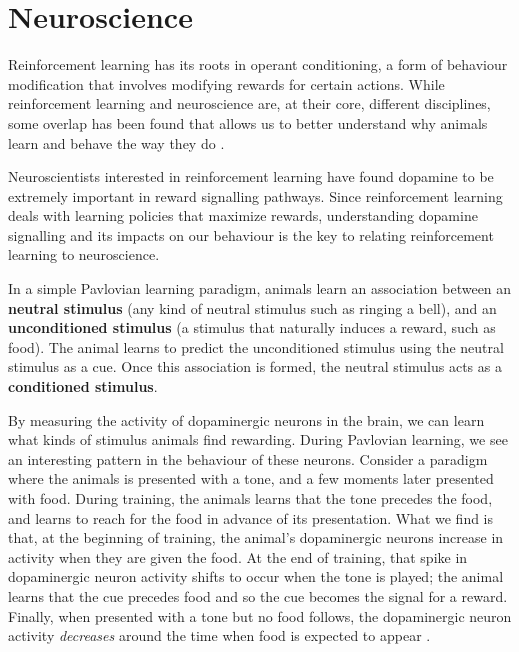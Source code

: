 \documentclass[journal, onecolumn, 12pt, draftclsnofoot]{IEEEtran}
\newcommand{\kword}[1]{\textbf{#1}}
\begin{document}
		\newpage
		\section{Neuroscience}
		\label{sec:neur}
		\par Reinforcement learning has its roots in operant conditioning, a form of behaviour modification that involves modifying rewards for certain actions. While reinforcement learning and neuroscience are, at their core, different disciplines, some overlap has been found that allows us to better understand why animals learn and behave the way they do \cite{brain}.
		\par Neuroscientists interested in reinforcement learning have found dopamine to be extremely important in reward signalling pathways. Since reinforcement learning deals with learning policies that maximize rewards, understanding dopamine signalling and its impacts on our behaviour is the key to relating reinforcement learning to neuroscience.
		\par In a simple Pavlovian learning paradigm, animals learn an association between an \kword{neutral stimulus} (any kind of neutral stimulus such as ringing a bell), and an \kword{unconditioned stimulus} (a stimulus that naturally induces a reward, such as food). The animal learns to predict the unconditioned stimulus using the neutral stimulus as a cue. Once this association is formed, the neutral stimulus acts as a \kword{conditioned stimulus}.
		\par By measuring the activity of dopaminergic neurons in the brain, we can learn what kinds of stimulus animals find rewarding. During Pavlovian learning, we see an interesting pattern in the behaviour of these neurons. Consider a paradigm where the animals is presented with a tone, and a few moments later presented with food. During training, the animals learns that the tone precedes the food, and learns to reach for the food in advance of its presentation. What we find is that, at the beginning of training, the animal's dopaminergic neurons increase in activity when they are given the food. At the end of training, that spike in dopaminergic neuron activity shifts to occur when the tone is played; the animal learns that the cue precedes food and so the cue becomes the signal for a reward. Finally, when presented with a tone but no food follows, the dopaminergic neuron activity \textit{decreases} around the time when food is expected to appear \cite{brain}.
\end{document}
